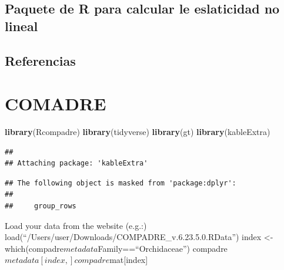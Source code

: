 \documentclass[
]{book}
\newenvironment{Shaded}{\begin{snugshade}}{\end{snugshade}}
\newcommand{\CommentTok}[1]{\textcolor[rgb]{0.56,0.35,0.01}{\textit{#1}}}
\newcommand{\FunctionTok}[1]{\textcolor[rgb]{0.13,0.29,0.53}{\textbf{#1}}}
\newcommand{\NormalTok}[1]{#1}
\newcommand{\OtherTok}[1]{\textcolor[rgb]{0.56,0.35,0.01}{#1}}
\newcommand{\SpecialCharTok}[1]{\textcolor[rgb]{0.81,0.36,0.00}{\textbf{#1}}}
\newcommand{\StringTok}[1]{\textcolor[rgb]{0.31,0.60,0.02}{#1}}
\theoremstyle{definition}
\theoremstyle{definition}
\theoremstyle{definition}
\theoremstyle{definition}
\theoremstyle{remark}
\begin{document}
\hypertarget{paquete-de-r-para-calcular-le-eslaticidad-no-lineal}{%
\section{Paquete de R para calcular le eslaticidad no lineal}\label{paquete-de-r-para-calcular-le-eslaticidad-no-lineal}}

\hypertarget{referencias-8}{%
\section{Referencias}\label{referencias-8}}

\hypertarget{comadre}{%
\chapter{COMADRE}\label{comadre}}

\begin{Shaded}
\begin{Highlighting}[]
\FunctionTok{library}\NormalTok{(Rcompadre)}
\FunctionTok{library}\NormalTok{(tidyverse)}
\FunctionTok{library}\NormalTok{(gt)}
\FunctionTok{library}\NormalTok{(kableExtra)}
\end{Highlighting}
\end{Shaded}

\begin{verbatim}
## 
## Attaching package: 'kableExtra'
\end{verbatim}

\begin{verbatim}
## The following object is masked from 'package:dplyr':
## 
##     group_rows
\end{verbatim}

Load your data from the website (e.g.:)
load(``/Users/user/Downloads/COMPADRE\_v.6.23.5.0.RData'')
index \textless- which(compadre\(metadata\)Family==``Orchidaceae'')
compadre\(metadata[index,] compadre\)mat{[}index{]}

\begin{Shaded}
\end{Shaded}
\end{document}
